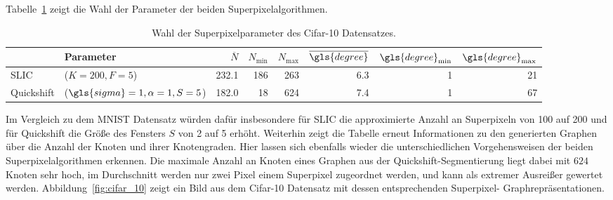 Tabelle~\ref{tab:cifar_10} zeigt die Wahl der Parameter der beiden Superpixelalgorithmen.
\begin{table}[t]
\centering
\begin{tabular}{llrrrrrr}
  \toprule
  & Parameter & $\overline{N}$ & $N_{\min}$ & $N_{\max}$ & $\overline{\gls{degree}}$ & $\gls{degree}_{\min}$ & $\gls{degree}_{\max}$\\
  \midrule
  \gls{SLIC} & ($K=200, F=5$) & 232.1 & 186 & 263 & 6.3 & 1 & 21\\
  Quickshift & ($\gls{sigma}=1, \alpha=1, S=5$) & 182.0 & 18 & 624 & 7.4 & 1 & 67\\
  \bottomrule
\end{tabular}
\caption[\gls{Cifar}-10 Superpixelparameter]{Wahl der Superpixelparameter des \gls{Cifar}-10 Datensatzes.}
\label{tab:cifar_10}
\end{table}
Im Vergleich zu dem \gls{MNIST} Datensatz würden dafür insbesondere für \gls{SLIC} die approximierte Anzahl an Superpixeln von 100 auf 200 und für Quickshift die Größe des Fensters $S$ von 2 auf 5 erhöht.
Weiterhin zeigt die Tabelle erneut Informationen zu den generierten Graphen über die Anzahl der Knoten und ihrer Knotengraden.
Hier lassen sich ebenfalls wieder die unterschiedlichen Vorgehensweisen der beiden Superpixelalgorithmen erkennen.
Die maximale Anzahl an Knoten eines Graphen aus der Quickshift-Segmentierung liegt dabei mit $624$ Knoten sehr hoch, \dhe{} im Durchschnitt werden nur zwei Pixel einem Superpixel zugeordnet werden, und kann als extremer Ausreißer gewertet werden.
Abbildung~\ref{fig:cifar_10} zeigt ein Bild aus dem \gls{Cifar}-10 Datensatz mit dessen entsprechenden Superpixel- \bzw{} Graphrepräsentationen.


